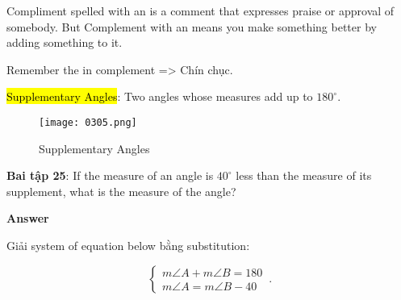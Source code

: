 Compliment spelled with an  is a comment that expresses praise or approval of somebody. But Complement with an  means you make something better by adding something to it.

Remember the  in complement => Chín chục.

\vspace{10 mm}

\hl{Supplementary Angles}: Two angles whose measures add up to $180^{\circ}$.

\begin{figure}[htb!]
  \centering
  \texttt{[image: 0305.png]}
  \caption{Supplementary Angles}
\end{figure}

\textbf{Bai tập 25}: If the measure of an angle is $40^{\circ}$ less than the measure of its supplement, what is the measure of the angle?

\vspace{0.2 cm}

\centerline{\textbf{\normalsize Answer}}

\vspace{0.2 cm}

Giải system of equation below bằng substitution:

\begin{equation*}
    \begin{cases}
      m\angle A + m\angle B = 180\\
      m\angle A = m\angle B -40
    \end{cases}\,.
\end{equation*}
